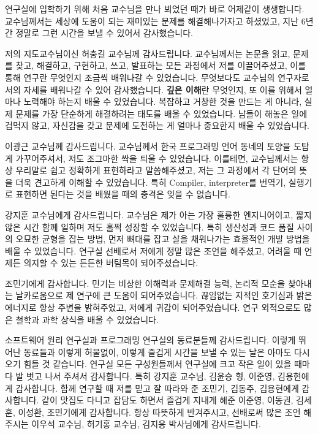 \begin{acknowledgement}
  연구실에 입학하기 위해 처음 교수님을 만나 뵈었던 때가 바로 어제같이 생생합니다. 교수님께서는 세상에 도움이 되는 재미있는 문제를 해결해나가자고 하셨었고, 지난 6년간 정말로 그런 시간을 보낼 수 있어서 감사했습니다.

  저의 지도교수님이신 허충길 교수님께 감사드립니다.
  교수님께서는 논문을 읽고, 문제를 찾고, 해결하고, 구현하고, 쓰고, 발표하는 모든 과정에서 저를 이끌어주셨고, 이를 통해 연구란 무엇인지 조금씩 배워나갈 수 있었습니다.
  무엇보다도 교수님의 연구자로서의 자세를 배워나갈 수 있어 감사했습니다.
  \textbf{깊은 이해}란 무엇인지, 또 이를 위해서 얼마나 노력해야 하는지 배울 수 있었습니다.
  복잡하고 거창한 것을 만드는 게 아니라, 실제 문제를 가장 단순하게 해결하려는 태도를 배울 수 있었습니다.
  남들이 해놓은 일에 겁먹지 않고, 자신감을 갖고 문제에 도전하는 게 얼마나 중요한지 배울 수 있었습니다.

  이광근 교수님께 감사드립니다.
  교수님께서 한국 프로그래밍 언어 동네의 토양을 도탑게 가꾸어주셔서, 저도 조그마한 싹을 틔울 수 있었습니다.
  이를테면, 교수님께서는 항상 우리말로 쉽고 정확하게 표현하라고 말씀해주셨고, 저는 그 과정에서 각 단어의 뜻을 더욱 견고하게 이해할 수 있었습니다.
  특히 Compiler, interpreter를 번역기, 실행기로 표현하면 된다는 것을 배웠을 때의 충격은 잊을 수 없습니다.

  강지훈 교수님에게 감사드립니다.
  교수님은 제가 아는 가장 훌륭한 엔지니어이고, 짧지 않은 시간 함께 일하며 저도 훌쩍 성장할 수 있었습니다. 
  특히 생산성과 코드 품질 사이의 오묘한 균형을 잡는 방법, 먼저 뼈대를 잡고 살을 채워나가는 효율적인 개발 방법을 배울 수 있었습니다.
  연구실 선배로서 저에게 정말 많은 조언을 해주셨고, 어려울 때 언제든 의지할 수 있는 든든한 버팀목이 되어주셨습니다.

  조민기에게 감사합니다.
  민기는 비상한 이해력과 문제해결 능력, 논리적 모순을 찾아내는 날카로움으로 제 연구에 큰 도움이 되어주었습니다.
  끊임없는 지적인 호기심과 밝은 에너지로 항상 주변을 밝혀주었고, 저에게 귀감이 되어주었습니다.
  연구 외적으로도 많은 철학과 과학 상식을 배울 수 있었습니다.

  소프트웨어 원리 연구실과 프로그래밍 연구실의 동료분들께 감사드립니다.
  이렇게 뛰어난 동료들과 이렇게 허물없이, 이렇게 즐겁게 시간을 보낼 수 있는 날은 아마도 다시 오기 힘들 것 같습니다.
  연구실 모든 구성원들께서 연구실에 크고 작은 일이 있을 때마다 발 벗고 나서 주셔서 감사합니다. 특히 강지훈 교수님, 김윤승 형, 이준영, 김용현에게 감사합니다.
  함께 연구할 때 저를 믿고 잘 따라와 준 조민기, 김동주, 김용현에게 감사합니다.
  같이 맛집도 다니고 잡담도 하면서 즐겁게 지내게 해준 이준영, 이동권, 김세훈, 이성환, 조민기에게 감사합니다.
  항상 따뜻하게 반겨주시고, 선배로써 많은 조언 해주시는 이우석 교수님, 허기홍 교수님, 김지응 박사님에게 감사드립니다.


\end{acknowledgement}
